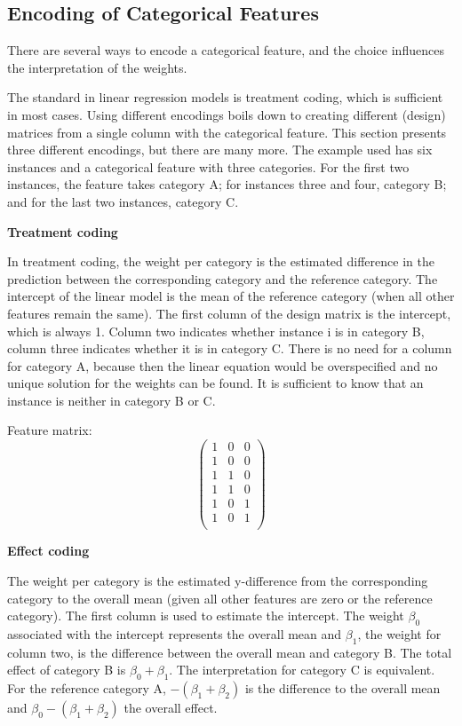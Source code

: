 \documentclass[
  12pt,
]{krantz}
\begin{document}
\hypertarget{cat-code}{%
\subsection{Encoding of Categorical Features}\label{cat-code}}

There are several ways to encode a categorical feature, and the choice influences the interpretation of the weights.

The standard in linear regression models is treatment coding, which is sufficient in most cases.
Using different encodings boils down to creating different (design) matrices from a single column with the categorical feature.
This section presents three different encodings, but there are many more.
The example used has six instances and a categorical feature with three categories.
For the first two instances, the feature takes category A;
for instances three and four, category B;
and for the last two instances, category C.

\textbf{Treatment coding}

In treatment coding, the weight per category is the estimated difference in the prediction between the corresponding category and the reference category.
The intercept of the linear model is the mean of the reference category (when all other features remain the same).
The first column of the design matrix is the intercept, which is always 1.
Column two indicates whether instance i is in category B, column three indicates whether it is in category C.
There is no need for a column for category A, because then the linear equation would be overspecified and no unique solution for the weights can be found.
It is sufficient to know that an instance is neither in category B or C.

Feature matrix: \[\begin{pmatrix}1&0&0\\1&0&0\\1&1&0\\1&1&0\\1&0&1\\1&0&1\\\end{pmatrix}\]

\textbf{Effect coding}

The weight per category is the estimated y-difference from the corresponding category to the overall mean (given all other features are zero or the reference category).
The first column is used to estimate the intercept.
The weight \(\beta_{0}\) associated with the intercept represents the overall mean and \(\beta_{1}\), the weight for column two, is the difference between the overall mean and category B.
The total effect of category B is \(\beta_{0}+\beta_{1}\).
The interpretation for category C is equivalent.
For the reference category A, \(-(\beta_{1}+\beta_{2})\) is the difference to the overall mean and \(\beta_{0}-(\beta_{1}+\beta_{2})\) the overall effect.
\end{document}

